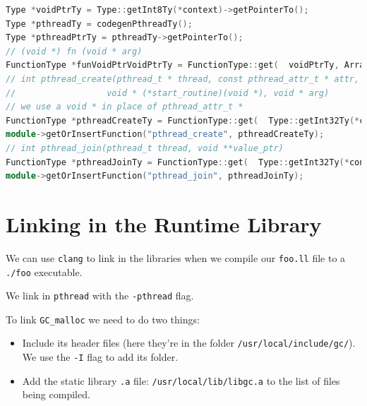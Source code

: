 %

\begin{lstlisting}[language=C++,caption={extern\_functions\_codegen.cc}]
Type *voidPtrTy = Type::getInt8Ty(*context)->getPointerTo();
Type *pthreadTy = codegenPthreadTy();
Type *pthreadPtrTy = pthreadTy->getPointerTo();
// (void *) fn (void * arg)
FunctionType *funVoidPtrVoidPtrTy = FunctionType::get(  voidPtrTy, ArrayRef<Type *>({voidPtrTy}),  /* has variadic args */ false);
// int pthread_create(pthread_t * thread, const pthread_attr_t * attr,
//                  void * (*start_routine)(void *), void * arg)
// we use a void * in place of pthread_attr_t *
FunctionType *pthreadCreateTy = FunctionType::get(  Type::getInt32Ty(*context),  ArrayRef<Type *>({pthreadPtrTy, voidPtrTy,                (funVoidPtrVoidPtrTy)->getPointerTo(),                voidPtrTy}),  /* has variadic args */ false);
module->getOrInsertFunction("pthread_create", pthreadCreateTy);
// int pthread_join(pthread_t thread, void **value_ptr)
FunctionType *pthreadJoinTy = FunctionType::get(  Type::getInt32Ty(*context),  ArrayRef<Type *>({pthreadTy, voidPtrTy->getPointerTo()}),  /* has variadic args */ false);
module->getOrInsertFunction("pthread_join", pthreadJoinTy);
\end{lstlisting}

\hypertarget{linking-in-the-runtime-library}{%
\section{\texorpdfstring{\protect\hyperlink{linking-in-the-runtime-library}{}Linking
in the Runtime
Library}{Linking in the Runtime Library}}\label{linking-in-the-runtime-library}}

We can use \texttt{clang} to link in the libraries when we compile our
\texttt{foo.ll} file to a \texttt{./foo} executable.

We link in \texttt{pthread} with the \texttt{-pthread} flag.

To link \texttt{GC\_malloc} we need to do two things:

\begin{itemize}
\tightlist
\item
  Include its header files (here they're in the folder
  \texttt{/usr/local/include/gc/}). We use the \texttt{-I} flag to add
  its folder.
\item
  Add the static library \texttt{.a} file:
  \texttt{/usr/local/lib/libgc.a} to the list of files being compiled.
\end{itemize}


